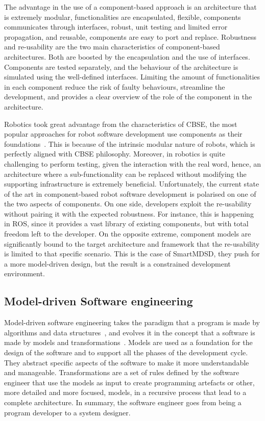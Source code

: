 The advantage in the use of a component-based approach is an architecture that is extremely modular, functionalities are encapsulated, flexible, components communicates through interfaces, robust, unit testing and limited error propagation, and reusable, components are easy to port and replace. Robustness and re-usability are the two main characteristics of component-based architectures. Both are boosted by the encapsulation and the use of interfaces. Components are tested separately, and the behaviour of the architecture is simulated using the well-defined interfaces. Limiting the amount of functionalities in each component reduce the risk of faulty behaviours, streamline the development, and provides a clear overview of the role of the component in the architecture.

Robotics took great advantage from the characteristics of CBSE, the most popular approaches for robot software development use components as their foundations~\cite{brugali2009component, brugali2010component}. This is because of the intrinsic modular nature of robots, which is perfectly aligned with CBSE philosophy. Moreover, in robotics is quite challenging to perform testing, given the interaction with the real word, hence, an architecture where a sub-functionality can be replaced without modifying the supporting infrastructure is extremely beneficial. Unfortunately, the current state of the art in component-based robot software development is polarised on one of the two aspects of components. On one side, developers exploit the re-usability without pairing it with the expected robustness. For instance, this is happening in ROS, since it provides a vast library of existing components, but with total freedom left to the developer. On the opposite extreme, component models are significantly bound to the target architecture and framework that the re-usability is limited to that specific scenario. This is the case of SmartMDSD, they push for a more model-driven design, but the result is a constrained development environment. 

\subsection{Model-driven Software engineering}
Model-driven software engineering takes the paradigm that a program is made by algorithms and data structures~\cite{wirth1986algorithms}, and evolves it in the concept that a software is made by models and transformations~\cite{brambilla2012model}. Models are used as a foundation for the design of the software and to support all the phases of the development cycle. They abstract specific aspects of the software to make it more understandable and manageable. Transformations are a set of rules defined by the software engineer that use the models as input to create programming artefacts or other, more detailed and more focused, models, in a recursive process that lead to a complete architecture. In summary, the software engineer goes from being a program developer to a system designer.

